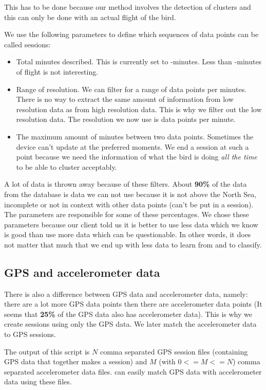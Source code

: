 This has to be done because our method involves the detection of clusters and this
can only be done with an actual flight of the bird. 

We use the following parameters to define which sequences of data points can be called sessions: 
\begin{itemize}
    \item Total minutes described. This is currently set to \minimumSessionLengthMinutes -minutes. Less than \minimumSessionLengthMinutes -minutes of flight is not interesting.
    \item Range of resolution. We can filter for a range of data points per minutes. There is
no way to extract the same amount of information from low resolution data as from high 
resolution data. This is why we filter out the low resolution data. The resolution 
we now use is \resolutionRange data points per minute.
    \item The maximum amount of minutes between two data points. Sometimes the device
can't update at the preferred moments. We end a session at such a point because we need
the information of what the bird is doing \emph{all the time} to be able to cluster 
acceptably. 
\end{itemize}

A lot of data is thrown away because of these filters. About \textbf{90\%} of the data 
from the database is data we can not use because it is not above the North Sea, incomplete
or not in context with other data points (can't be put in a session). The parameters are  
responsible for 
some of these percentages. We chose these parameters because our client told us it is better
to use less data which we know is good than use more data which can be questionable. In 
other words, it does not matter that much that we end up with less data to learn from and
to classify. 

\subsection{GPS and accelerometer data}
\label{subsec:gpsAndAccelerometerData}
There is also a difference between GPS data and accelerometer data, namely: there are a lot
more GPS data points then there are accelerometer data points
(It seems that \textbf{25\%} of the GPS data also has accelerometer data).
This is why we create 
sessions using only
the GPS data. We later match the accelerometer data to GPS sessions. 

The output of this
script is $N$ comma separated GPS session files (containing GPS data that together makes
a session) and $M$ (with $0 <= M <= N$) comma separated accelerometer data files. \matlab
can easily match GPS data with accelerometer data using these files. 

